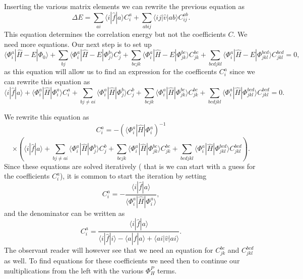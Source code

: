 \documentclass[graybox,sectrefs,envcountresetchap,open=right]{svmonodo}
\begin{document}
Inserting the various matrix elements we can rewrite the previous equation as
\[
\Delta E=\sum_{ai}\langle i| \hat{f}|a \rangle C_{i}^{a}+
\sum_{abij}\langle ij | \hat{v}| ab \rangle C_{ij}^{ab}.
\]
This equation determines the correlation energy but not the coefficients $C$. 
We need more equations. Our next step is to set up
\[
\langle \Phi_i^a | \hat{H} -E| \Phi_0\rangle + \sum_{bj}\langle \Phi_i^a | \hat{H} -E|\Phi_{j}^{b} \rangle C_{j}^{b}+
\sum_{bcjk}\langle \Phi_i^a | \hat{H} -E|\Phi_{jk}^{bc} \rangle C_{jk}^{bc}+
\sum_{bcdjkl}\langle \Phi_i^a | \hat{H} -E|\Phi_{jkl}^{bcd} \rangle C_{jkl}^{bcd}=0,
\]
as this equation will allow us to find an expression for the coefficents $C_i^a$ since we can rewrite this equation as 
\[
\langle i | \hat{f}| a\rangle +\langle \Phi_i^a | \hat{H}|\Phi_{i}^{a} \rangle C_{i}^{a}+ \sum_{bj\ne ai}\langle \Phi_i^a | \hat{H}|\Phi_{j}^{b} \rangle C_{j}^{b}+
\sum_{bcjk}\langle \Phi_i^a | \hat{H}|\Phi_{jk}^{bc} \rangle C_{jk}^{bc}+
\sum_{bcdjkl}\langle \Phi_i^a | \hat{H}|\Phi_{jkl}^{bcd} \rangle C_{jkl}^{bcd}=0.
\]


We rewrite this equation as
\[
C_{i}^{a}=-(\langle \Phi_i^a | \hat{H}|\Phi_{i}^{a})^{-1}
\]
\[
\times\left(\langle i | \hat{f}| a\rangle+ \sum_{bj\ne ai}\langle \Phi_i^a | \hat{H}|\Phi_{j}^{b} \rangle C_{j}^{b}+\sum_{bcjk}\langle \Phi_i^a | \hat{H}|\Phi_{jk}^{bc} \rangle C_{jk}^{bc}+
\sum_{bcdjkl}\langle \Phi_i^a | \hat{H}|\Phi_{jkl}^{bcd} \rangle C_{jkl}^{bcd}\right).
\]
Since these equations are solved iteratively ( that is we can start with a guess for the coefficients $C_i^a$), it is common to start the  iteration 
by setting 
\[
 C_{i}^{a}=-\frac{\langle i | \hat{f}| a\rangle}{\langle \Phi_i^a | \hat{H}|\Phi_{i}^{a}\rangle},
\]
and the denominator can be written as
\[
  C_{i}^{a}=\frac{\langle i | \hat{f}| a\rangle}{\langle i | \hat{f}| i\rangle-\langle a | \hat{f}| a\rangle+\langle ai | \hat{v}| ai\rangle}.
\]
The observant reader will however see that we need an equation for $C_{jk}^{bc}$ and $C_{jkl}^{bcd}$ as well.
To find equations for these coefficients we need then to continue our multiplications from the left with the various
$\Phi_{H}^P$ terms. 
\end{document}

